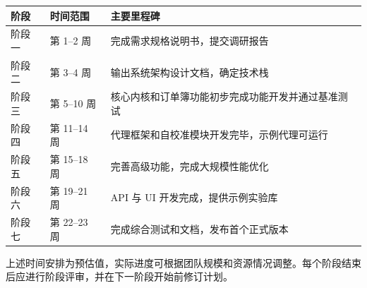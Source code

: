 \begin{tabular}{p{2cm}p{4cm}p{7cm}}
\hline
\textbf{阶段} & \textbf{时间范围} & \textbf{主要里程碑} \\
\hline
阶段一 & 第 1–2 周 & 完成需求规格说明书，提交调研报告 \\
阶段二 & 第 3–4 周 & 输出系统架构设计文档，确定技术栈 \\
阶段三 & 第 5–10 周 & 核心内核和订单簿功能初步完成功能开发并通过基准测试 \\
阶段四 & 第 11–14 周 & 代理框架和自校准模块开发完毕，示例代理可运行 \\
阶段五 & 第 15–18 周 & 完善高级功能，完成大规模性能优化 \\
阶段六 & 第 19–21 周 & API 与 UI 开发完成，提供示例实验库 \\
阶段七 & 第 22–23 周 & 完成综合测试和文档，发布首个正式版本 \\
\hline
\end{tabular}

上述时间安排为预估值，实际进度可根据团队规模和资源情况调整。每个阶段结束后应进行阶段评审，并在下一阶段开始前修订计划。